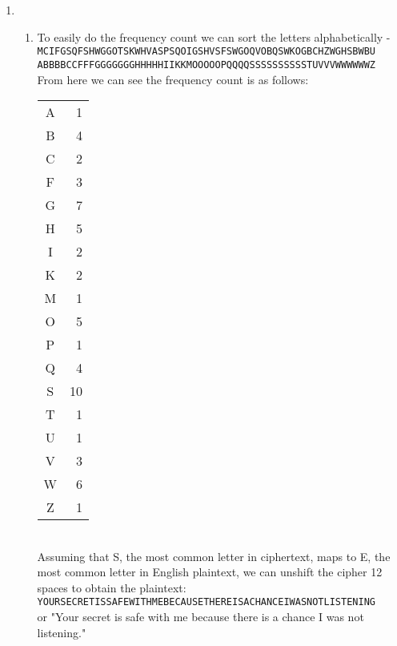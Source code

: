 \documentclass[12pt,letterpaper]{article}
\begin{document}
\begin{enumerate}
    \item
    \begin{enumerate}
    \item
        To easily do the frequency count we can sort the letters alphabetically - \\
        {\tt MCIFGSQFSHWGGOTSKWHVASPSQOIGSHVSFSWGOQVOBQSWKOGBCHZWGHSBWBU}\\
        {\tt ABBBBCCFFFGGGGGGGHHHHHIIKKMOOOOOPQQQQSSSSSSSSSSTUVVVWWWWWWZ}\\
        From here we can see the frequency count is as follows:\\
        \begin{tabular}{cr}
            A &  1 \\
            B &  4 \\
            C &  2 \\
            F &  3 \\
            G &  7 \\
            H &  5 \\
            I &  2 \\
            K &  2 \\
            M &  1 \\
            O &  5 \\
            P &  1 \\
            Q &  4 \\
            S & 10 \\
            T &  1 \\
            U &  1 \\
            V &  3 \\
            W &  6 \\
            Z &  1 \\
        \end{tabular}\\
        Assuming that S, the most common letter in ciphertext, maps to E, the most common letter in English plaintext, we can unshift the cipher 12 spaces to obtain the plaintext:\\
        {\tt YOURSECRETISSAFEWITHMEBECAUSETHEREISACHANCEIWASNOTLISTENING}\\
        or "Your secret is safe with me because there is a chance I was not listening."
    \end{enumerate}



\end{enumerate}
\end{document}

